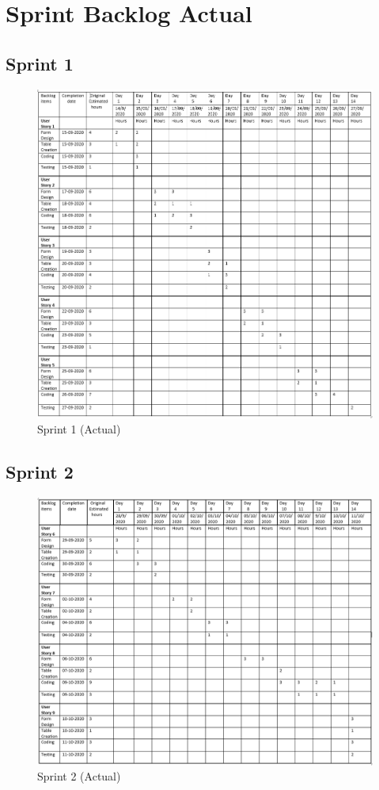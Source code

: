 \documentclass[a4paper,12pt]{report}
\begin{document}
\section{Sprint Backlog Actual}
\subsection {Sprint 1}
\begin{figure}[bph]
	\centering
	\includegraphics[width=0.9\linewidth]{img/sprint/sp1actual}
	\caption{Sprint 1 (Actual)}
\end{figure}
\pagebreak
\subsection {Sprint 2}
\begin{figure}[bph]
	\centering
	\includegraphics[width=0.9\linewidth]{img/sprint/SPRINT2ACTUAL}
	\caption{Sprint 2 (Actual)}
\end{figure}
\pagebreak
\end{document}
